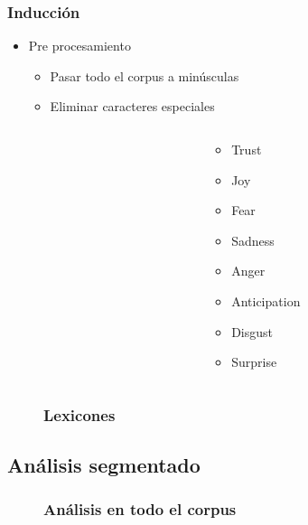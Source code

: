 \documentclass{beamer}
\begin{document}
\begin{frame}
\frametitle{Inducción}
\begin{itemize}
[triangle]
	\item Pre procesamiento
	\begin{itemize}
	[circle]
		\item Pasar todo el corpus a minúsculas
		\item Eliminar caracteres especiales
	\end{itemize}	
		\begin{columns}
\begin{column}{0.5\textwidth}
\end{column}
\begin{column}{0.3\textwidth}
\begin{itemize}
    \item Trust
    \item Joy
    \item Fear
    \item Sadness
    \item Anger
    \item Anticipation
    \item Disgust
    \item Surprise
\end{itemize}
\end{column}
\end{columns}
	\end{itemize}
\end{frame}


\begin{frame}
\begin{figure}[h]
\frametitle{Lexicones}
\end{figure}
\end{frame}



\subsection{Análisis segmentado}

\begin{frame}
\begin{figure}[h]
\frametitle{Análisis en todo el corpus}
\end{figure}
\end{frame}
\end{document}
